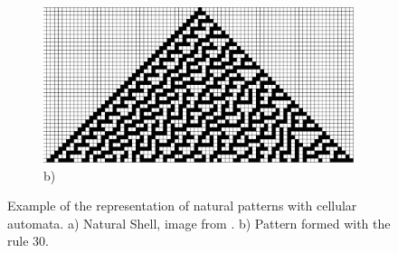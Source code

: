 \begin{figure}
        \begin{subfigure}[b]{0.9\textwidth}
                \includegraphics[width=\textwidth]{img/Theory/Cellular_A/Rule30.png}
				\caption{b)}
				\label{fig:CArule30}
        \end{subfigure}
        \caption{Example of the representation of natural patterns with cellular automata. a) Natural Shell, image from \cite{Shiffman2012}. b) Pattern formed with the rule 30.}
		\label{fig:CArule30shell}
\end{figure}



